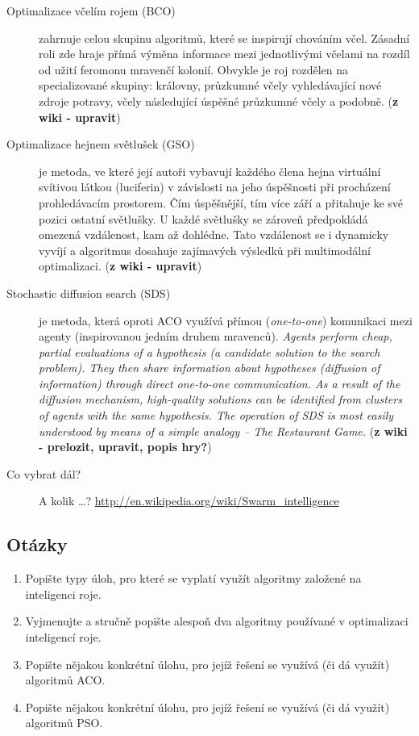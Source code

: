\documentclass[a4paper,12pt]{article}
\begin{document}
\begin{description} %

\item[Optimalizace včelím rojem (BCO)] zahrnuje celou skupinu algoritmů, které se inspirují chováním včel.
Zásadní roli zde hraje přímá výměna informace mezi jednotlivými včelami na rozdíl od užití feromonu mravenčí
kolonií. Obvykle je roj rozdělen na specializované skupiny: královny, průzkumné včely vyhledávající nové zdroje
potravy, včely následující úspěšné průzkumné včely a podobně. ({\bf z wiki - upravit})

\item[Optimalizace hejnem světlušek (GSO)] je metoda, ve které její autoři vybavují  každého člena hejna
virtuální svítivou látkou (luciferin) v závislosti na jeho úspěšnosti při procházení prohledávacím prostorem.
Čím úspěšnější, tím více září a přitahuje ke své pozici ostatní světlušky. U každé světlušky se zároveň
předpokládá omezená vzdálenost, kam až dohlédne. Tato vzdálenost se i dynamicky vyvíjí a algoritmus dosahuje
zajímavých výsledků při multimodální optimalizaci. ({\bf z wiki - upravit})

\item[Stochastic diffusion search (SDS)] je metoda, která oproti ACO využívá přímou ({\it one-to-one}) komunikaci
mezi agenty (inspirovanou jedním druhem mravenců). {\it Agents perform cheap, partial evaluations of a hypothesis (a candidate solution to the search problem). They then share information about hypotheses (diffusion of information) through direct one-to-one communication. As a result of the diffusion mechanism, high-quality solutions can be identified from clusters of agents with the same hypothesis. The operation of SDS is most easily understood by means of a simple analogy – The Restaurant Game.} ({\bf z wiki - prelozit, upravit, popis hry?})

\item[Co vybrat dál?] A kolik \dots ? \url{http://en.wikipedia.org/wiki/Swarm_intelligence}

\end{description}


\subsection{Otázky}
\begin{enumerate}
  \item Popište typy úloh, pro které se vyplatí využít algoritmy založené na inteligenci roje.
  \item Vyjmenujte a stručně popište alespoň dva algoritmy používané v optimalizaci inteligencí roje.
  \item Popište nějakou konkrétní úlohu, pro jejíž řešení se využívá (či dá využít) algoritmů ACO.
  \item Popište nějakou konkrétní úlohu, pro jejíž řešení se využívá (či dá využít) algoritmů PSO.
\end{enumerate}
\end{document}

